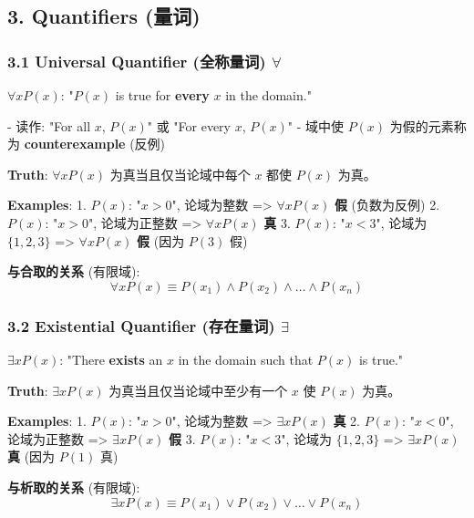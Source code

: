 \documentclass[10pt,a4paper,openany]{ctexbook}
\theoremstyle{definition}
\theoremstyle{remark}
\renewenvironment{quote}
  {\list{}{\leftmargin=1em\rightmargin=0pt\topsep=0.5pt\partopsep=0pt}\item[]}
  {\endlist}
\begin{document}
\vspace{-2pt}

\subsection{3. Quantifiers (量词)}

\subsubsection{3.1 Universal Quantifier (全称量词) $\forall$}

\begin{quote}
\textbf{$\forall x P(x)$}: "$P(x)$ is true for \textbf{every} $x$ in the domain."

- 读作: "For all $x$, $P(x)$" 或 "For every $x$, $P(x)$"
- 域中使 $P(x)$ 为假的元素称为 \textbf{counterexample} (反例)

\textbf{Truth}: $\forall x P(x)$ 为真当且仅当论域中每个 $x$ 都使 $P(x)$ 为真。

\textbf{Examples}:
1. $P(x)$: "$x > 0$", 论域为整数 => $\forall x P(x)$ \textbf{假} (负数为反例)
2. $P(x)$: "$x > 0$", 论域为正整数 => $\forall x P(x)$ \textbf{真}
3. $P(x)$: "$x < 3$", 论域为 $\{1,2,3\}$ => $\forall x P(x)$ \textbf{假} (因为 $P(3)$ 假)

\textbf{与合取的关系} (有限域):
\[
\forall x P(x) \equiv P(x_1) \land P(x_2) \land \dots \land P(x_n)
\]


\end{quote}

\subsubsection{3.2 Existential Quantifier (存在量词) $\exists$}

\begin{quote}
\textbf{$\exists x P(x)$}: "There \textbf{exists} an $x$ in the domain such that $P(x)$ is true."

\textbf{Truth}: $\exists x P(x)$ 为真当且仅当论域中至少有一个 $x$ 使 $P(x)$ 为真。

\textbf{Examples}:
1. $P(x)$: "$x > 0$", 论域为整数 => $\exists x P(x)$ \textbf{真}
2. $P(x)$: "$x < 0$", 论域为正整数 => $\exists x P(x)$ \textbf{假}
3. $P(x)$: "$x < 3$", 论域为 $\{1,2,3\}$ => $\exists x P(x)$ \textbf{真} (因为 $P(1)$ 真)

\textbf{与析取的关系} (有限域):
\[
\exists x P(x) \equiv P(x_1) \lor P(x_2) \lor \dots \lor P(x_n)
\]


\end{quote}
\end{document}
